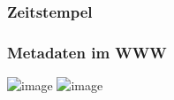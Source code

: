 \documentclass[12pt, xcolor={svgnames,table}]{beamer}
\begin{document}
\begin{frame}
    \frametitle{Zeitstempel}
    \begin{center}


    \end{center}
\end{frame}

\begin{frame}
    \frametitle{Metadaten im WWW}
    \begin{center} 
        \includegraphics<1>[width=0.7\textwidth]{img/lightbeam_1.png}
        \includegraphics<2>[width=0.7\textwidth]{img/lightbeam_2.png}
    \end{center}
\end{frame}
\end{document}
